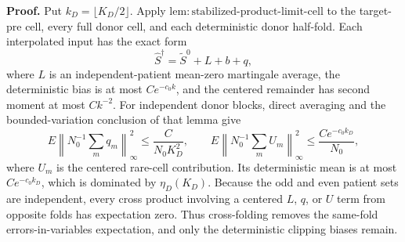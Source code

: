 \textbf{Proof.}
Put \(k_D=\lfloor K_D/2\rfloor\). Apply \(\mathrm{lem:stabilized\mbox{-}product\mbox{-}limit\mbox{-}cell}\) to the target-pre cell, every full donor cell, and each deterministic donor half-fold. Each interpolated input has the exact form
\[
 \widehat S^\dagger=\widetilde S^0+L+b+q,                 \tag{1}
\]
where \(L\) is an independent-patient mean-zero martingale average, the deterministic bias is at most \(Ce^{-c_0k}\), and the centered remainder has second moment at most \(Ck^{-2}\). For independent donor blocks, direct averaging and the bounded-variation conclusion of that lemma give
\[
 E\left\|N_0^{-1}\sum_mq_m\right\|_\infty^2
 \le\frac{C}{N_0K_D^2},
 \qquad
 E\left\|N_0^{-1}\sum_mU_m\right\|_\infty^2
 \le\frac{Ce^{-c_0k_D}}{N_0},                            \tag{2}
\]
where \(U_m\) is the centered rare-cell contribution. Its deterministic mean is at most \(Ce^{-c_0k_D}\), which is dominated by \(\eta_D(K_D)\). Because the odd and even patient sets are independent, every cross product involving a centered \(L\), \(q\), or \(U\) term from opposite folds has expectation zero. Thus cross-folding removes the same-fold errors-in-variables expectation, and only the deterministic clipping biases remain.

